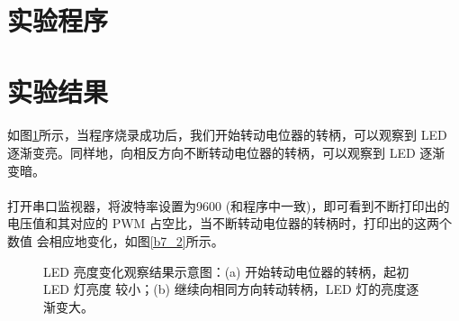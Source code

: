 \documentclass[UTF8, oneside]{ctexbook}
\begin{document}
\section{实验程序}


\section{实验结果}
\paragraph{}
如图\ref{b7_1}所示，当程序烧录成功后，我们开始转动电位器的转柄，可以观察到 
LED 逐渐变亮。同样地，向相反方向不断转动电位器的转柄，可以观察到 LED 逐渐
变暗。

\paragraph{}
打开串口监视器，将波特率设置为9600 (和程序中一致)，即可看到不断打印出的
电压值和其对应的 PWM 占空比，当不断转动电位器的转柄时，打印出的这两个数值
会相应地变化，如图\ref{b7_2}所示。
\newpage

\begin{figure}[h]
    \centering


    \centering
    \caption{LED 亮度变化观察结果示意图：(a) 开始转动电位器的转柄，起初 LED 灯亮度
    较小；(b) 继续向相同方向转动转柄，LED 灯的亮度逐渐变大。}
    \label{b7_1}
    
\end{figure}
\end{document}
